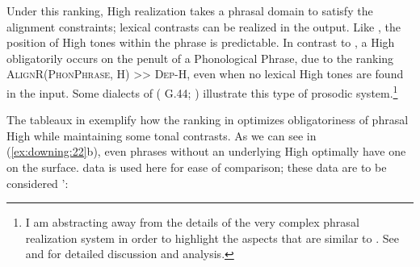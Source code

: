 \documentclass[output=paper
,newtxmath
,modfonts
,nonflat]{langsci/langscibook}
\begin{document}
Under this ranking, High  realization takes a phrasal domain to satisfy the alignment constraints; lexical  contrasts can be realized in the output. Like , the position of High tones within the phrase is predictable. In contrast to , a High  obligatorily occurs on the penult of a Phonological Phrase, due to the ranking \textsc{AlignR(PhonPhrase, H}) >> \textsc{Dep-H}, even when no lexical High tones are found in the input. Some dialects of  ( G.44; \citealt{Cassimjee&Kisseberth1998,Patin2017}) illustrate this type of prosodic system.\footnote{I am abstracting away from the details of the very complex  phrasal  realization system in order to highlight the aspects that are similar to . See \citet{Cassimjee&Kisseberth1998,Patin2007,Patin2017} and \citet{Philipson2005} for detailed discussion and analysis.}

The tableaux in  exemplify how the ranking in  optimizes obligatoriness of phrasal High  while maintaining some tonal contrasts. As we can see in (\ref{ex:downing:22}b), even phrases without an underlying High  optimally have one on the surface.  data is used here for ease of comparison; these data are to be considered ’:

\begin{comment} 
\ea%
    \label{bkm:Ref336871755}
    \langinfo{lg}{fam}{src}\\
    \gll \\  
        \\
    \glt
    \z
\end{comment}
\end{document}
